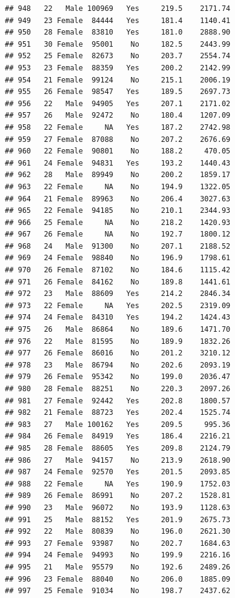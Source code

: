 \documentclass[12pt,]{krantz}
\theoremstyle{definition}
\theoremstyle{definition}
\theoremstyle{remark}
\begin{document}
\begin{verbatim}
## 948   22   Male 100969   Yes     219.5    2171.74
## 949   23 Female  84444   Yes     181.4    1140.41
## 950   28 Female  83810   Yes     181.0    2888.90
## 951   30 Female  95001    No     182.5    2443.99
## 952   25 Female  82673    No     203.7    2554.74
## 953   23 Female  88359   Yes     200.2    2142.99
## 954   21 Female  99124    No     215.1    2006.19
## 955   26 Female  98547   Yes     189.5    2697.73
## 956   22   Male  94905   Yes     207.1    2171.02
## 957   26   Male  92472    No     180.4    1207.09
## 958   22 Female     NA   Yes     187.2    2742.98
## 959   27 Female  87088    No     207.2    2676.69
## 960   22 Female  90801    No     188.2     470.05
## 961   24 Female  94831   Yes     193.2    1440.43
## 962   28   Male  89949    No     200.2    1859.17
## 963   22 Female     NA    No     194.9    1322.05
## 964   21 Female  89963    No     206.4    3027.63
## 965   22 Female  94185    No     210.1    2344.93
## 966   25 Female     NA    No     218.2    1420.93
## 967   26 Female     NA    No     192.7    1800.12
## 968   24   Male  91300    No     207.1    2188.52
## 969   24 Female  98840    No     196.9    1798.61
## 970   26 Female  87102    No     184.6    1115.42
## 971   26 Female  84162    No     189.8    1441.61
## 972   23   Male  88609   Yes     214.2    2846.34
## 973   22 Female     NA   Yes     202.5    2319.09
## 974   24 Female  84310   Yes     194.2    1424.43
## 975   26   Male  86864    No     189.6    1471.70
## 976   22   Male  81595    No     189.9    1832.26
## 977   26 Female  86016    No     201.2    3210.12
## 978   23   Male  86794    No     202.6    2093.19
## 979   26 Female  95342    No     199.0    2036.47
## 980   28 Female  88251    No     220.3    2097.26
## 981   27 Female  92442   Yes     202.8    1800.57
## 982   21 Female  88723   Yes     202.4    1525.74
## 983   27   Male 100162   Yes     209.5     995.36
## 984   26 Female  84919   Yes     186.4    2216.21
## 985   28 Female  88605   Yes     209.8    2124.79
## 986   27   Male  94157    No     213.9    2618.90
## 987   24 Female  92570   Yes     201.5    2093.85
## 988   22 Female     NA   Yes     190.9    1752.03
## 989   26 Female  86991    No     207.2    1528.81
## 990   23   Male  96072    No     193.9    1128.63
## 991   25   Male  88152   Yes     201.9    2675.73
## 992   22   Male  80839    No     196.0    2621.30
## 993   27 Female  93987    No     202.7    1684.63
## 994   24 Female  94993    No     199.9    2216.16
## 995   21   Male  95579    No     192.6    2489.26
## 996   23 Female  88040    No     206.0    1885.09
## 997   25 Female  91034    No     198.7    2437.62

\end{verbatim}
\end{document}
